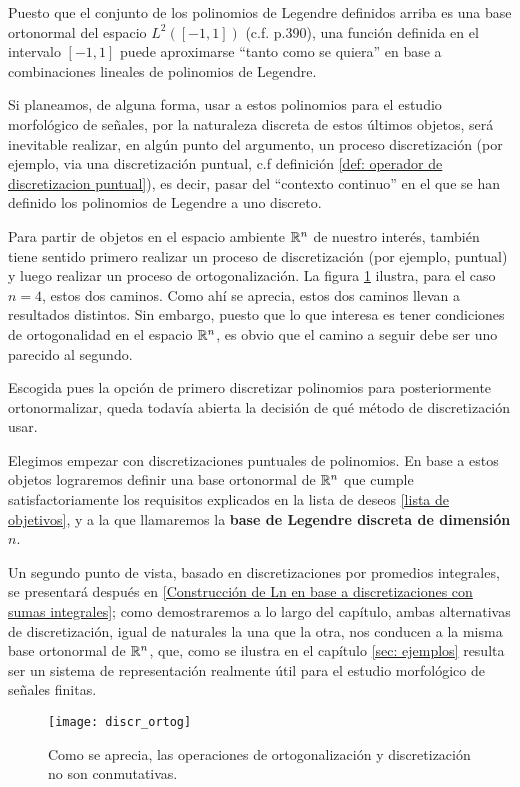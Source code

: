 Puesto que el conjunto de los polinomios de Legendre
definidos arriba es una base ortonormal del
espacio $L^{2}([-1,1])$
(c.f. \cite{DSML} p.390), una función definida
en el intervalo $[-1,1]$ puede aproximarse
``tanto como se quiera'' en base a combinaciones
lineales de polinomios de Legendre.


Si planeamos, de alguna forma, usar a estos polinomios
para el estudio morfológico de señales, por la naturaleza
discreta de estos últimos objetos, será
inevitable realizar, en algún punto 
del argumento, un proceso discretización
(por ejemplo, 
via una discretización
puntual, c.f definición \ref{def: operador de discretizacion puntual}), es decir,
pasar del ``contexto continuo'' en el que se han
definido los polinomios de Legendre a uno discreto.

Para partir de
objetos en el espacio ambiente
$\mathbb{R}^{n}$ de nuestro interés,
también tiene sentido primero realizar
un proceso de discretización (por ejemplo, 
puntual) y luego realizar
un proceso de ortogonalización. La figura
\ref{fig: ortogonalizacion, discretizacion}
ilustra, para el caso $n=4$, estos dos caminos.
Como ahí se aprecia, estos dos caminos llevan 
a resultados distintos. Sin embargo, puesto que lo
que interesa es tener condiciones de ortogonalidad
en el espacio $\mathbb{R}^{n}$, es obvio que 
el camino a seguir debe ser uno parecido al segundo.


Escogida pues la opción de primero 
discretizar polinomios para posteriormente
ortonormalizar, queda todavía abierta
la decisión de qué método de discretización usar.

Elegimos empezar
con discretizaciones puntuales de polinomios.
En base a estos objetos lograremos definir
una base ortonormal de $\mathbb{R}^{n}$ que cumple satisfactoriamente
los requisitos explicados en la lista de deseos
\ref{lista de objetivos}, y a la que llamaremos
la \textbf{base de Legendre discreta de dimensión $n$}.

Un segundo punto de vista, basado
en discretizaciones por promedios integrales,
se presentará después en
\ref{Construcción de Ln en base a discretizaciones con sumas integrales}; 
como demostraremos a lo largo del capítulo, 
ambas alternativas
de discretización, igual de naturales la una que la otra, nos
conducen a la misma base ortonormal de $\mathbb{R}^{n}$,
que, como se ilustra en el capítulo \ref{sec: ejemplos} 
resulta ser un sistema de representación
realmente útil para el estudio morfológico de señales finitas.

\newpage %

\begin{figure}[H]
\centering\captionsetup{format = hang}
	\begin{measuredfigure}
		\label{fig: ortogonalizacion, discretizacion}
		\texttt{[image: discr\_ortog]} 
		\caption{Como se aprecia, las operaciones de
		ortogonalización y discretización no son conmutativas.}
 	\end{measuredfigure}
 \end{figure}